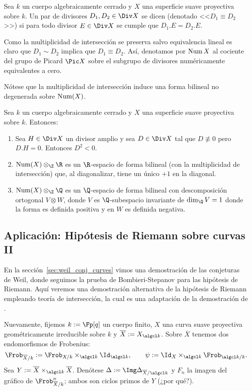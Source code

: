 \begin{mydef}
	Sea $k$ un cuerpo algebraicamente cerrado y $X$ una superficie suave proyectiva sobre $k$.
	Un par de divisores $D_1, D_2 \in \Div X$ se dicen 
	(denotado <<$D_1 \equiv D_2$>>) si para todo divisor $E \in \Div X$ se cumple que $D_1.E = D_2.E$.

	Como la multiplicidad de intersección se preserva salvo equivalencia lineal es claro que $D_1 \sim D_2$ implica que $D_1 \equiv D_2$.
	Así, denotamos por $\operatorname{Num} X$ al cociente del grupo de Picard $\Pic X$ sobre el subgrupo de divisores numéricamente equivalentes a cero.
\end{mydef}
Nótese que la multiplicidad de intersección induce una forma bilineal no degenerada sobre $\operatorname{Num}(X)$.

\begin{thm}
	Sea $k$ un cuerpo algebraicamente cerrado y $X$ una superficie suave proyectiva sobre $k$.
	Entonces:
	\begin{enumerate}
		\item Sea $H \in \Div X$ un divisor amplio y sea $D \in \Div X$ tal que $D \not\equiv 0$ pero $D.H = 0$.
			Entonces $D^2 < 0$.
		\item $\Num(X) \otimes_\Z \R$ es un $\R$-espacio de forma bilineal (con la multiplicidad de intersección) que,
			al diagonalizar, tiene un único $+1$ en la diagonal.
		\item $\Num(X) \otimes_\Z \Q$ es un $\Q$-espacio de forma bilineal con descomposición ortogonal $V \otimes W$,
			donde $V$ es $\Q$-subespacio invariante de $\dim_\Q V = 1$ donde la forma es definida positiva y en $W$ es definida negativa.
	\end{enumerate}
\end{thm}

\subsection{Aplicación: Hipótesis de Riemann sobre curvas II}%
\label{sec:weils_proof}
En la sección~\ref{sec:weil_conj_curves} vimos una demostración de las conjeturas de Weil, donde seguimos la prueba de Bombieri-Stepanov
para las hipótesis de Riemann.
Aquí veremos una demostración alternativa de la hipótesis de Riemann empleando teoría de intersección, la cual es una adaptación de la
demostración de \citet{weil48courbes}.

Nuevamente, fijemos $k := \Fp[q]$ un cuerpo finito, $X$ una curva suave proyectiva geométricamente irreducible sobre $k$ y $\overline{X} := X_{\algcl k}$.
Sobre $\overline{X}$ tenemos dos endomorfismos de Frobenius:
$$ \Frob_{\overline{X}/k} := \Frob_{X/k} \times_{\algcl k} \Id_{\algcl k}, \qquad \psi := \Id_X \times_{\algcl k} \Frob_{\algcl k/k}. $$
Sea $Y := \overline{X} \times_{\algcl k} \overline{X}$.
Denótese $\Delta := \Img\Delta_{\overline{X}/\algcl k}$ y $F_n$ la imagen del gráfico de $\Frob_{\overline{X}/k}^n$;
ambos son ciclos primos de $Y$ (¿por qué?).

